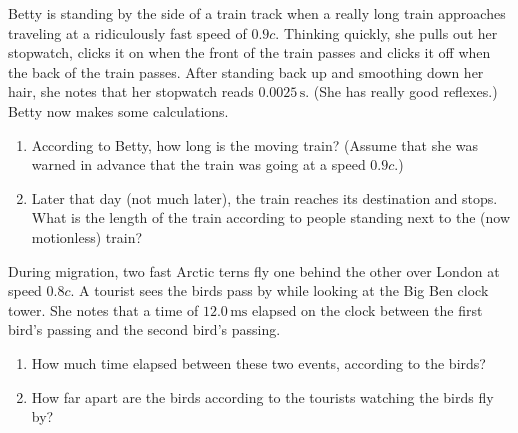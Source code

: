 \begin{exercise}
Betty is standing by the side of a train track when a really
long train approaches traveling at a ridiculously fast speed of $0.9c$.
Thinking quickly, she pulls out her stopwatch, clicks it on when the
front of the train passes and clicks it off when the back of the train
passes.  After standing back up and smoothing down her hair, she notes
that her stopwatch reads $0.0025\,\text{s}$.  (She has really good reflexes.)
Betty now makes some calculations.
    \begin{enumerate}
    \item According to Betty, how long is the moving train?  (Assume
     that she was warned in advance that the train was going at a
     speed $0.9c$.)
     \item Later that day (not much later), the train reaches its
     destination and stops.  What is the length of the train according
     to people standing next to the (now motionless) train?
     \end{enumerate}
\end{exercise}

\begin{exercise}
During migration, two fast Arctic terns fly one behind the other
over London at speed $0.8 c$.
A tourist  sees the birds pass by while looking at the Big Ben clock tower.
She notes that
a time of $12.0\,\text{ms}$ elapsed on the clock between the first 
bird's passing and the second bird's passing.
    \begin{enumerate}
    \item How much time elapsed between these two events, according to
    the birds?
    \item How far apart are the birds according to the tourists watching the
birds fly by?  
    \end{enumerate}
\label{prob:terns}
\end{exercise}

